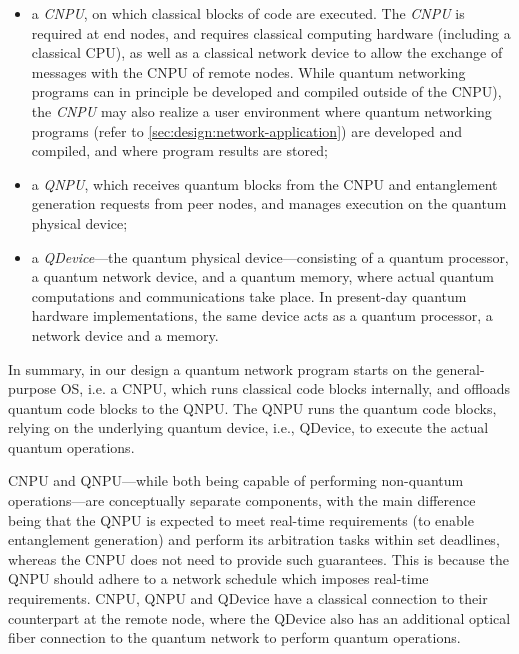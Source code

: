 \begin{itemize}
\item a \emph{\ac{CNPU}}, on which classical blocks of code are executed. The \emph{CNPU} is required at end nodes, and requires classical computing hardware (including a classical \ac{CPU}), as well as a classical network device to allow the exchange of messages with the \ac{CNPU} of remote nodes. While quantum networking programs can in principle be developed and compiled outside of the \ac{CNPU}), the \emph{CNPU} may also realize a user environment where quantum networking programs (refer to \cref{sec:design:network-application}) are developed and compiled, and where program results are stored; 
\item a \emph{\ac{QNPU}}, which receives quantum blocks from the \ac{CNPU} and entanglement generation requests from peer nodes, and manages execution on the quantum physical device; 
\item a \emph{\ac{QDevice}}---the quantum physical device---consisting of a quantum processor, a quantum network device, and a quantum memory, where actual quantum computations and communications take place. In present-day quantum hardware implementations, the same device acts as a quantum processor, a network device and a memory.
\end{itemize}

In summary, in our design a quantum network program starts on the general-purpose \ac{OS}, i.e. a \ac{CNPU}, which runs classical code blocks internally, and offloads quantum code blocks to the \ac{QNPU}. The \ac{QNPU} runs the quantum code blocks, relying on the underlying quantum device, i.e., \ac{QDevice}, to execute the actual quantum operations. 

\ac{CNPU} and \ac{QNPU}---while both being capable of performing non-quantum operations---are conceptually separate components, with the main difference being that the \ac{QNPU} is expected to meet real-time requirements (to enable entanglement generation) and perform its arbitration tasks within set deadlines, whereas the \ac{CNPU} does not need to provide such guarantees. This is because the QNPU should adhere to a network schedule which imposes real-time requirements. \ac{CNPU}, \ac{QNPU} and \ac{QDevice} have a classical connection to their counterpart at the remote node, where the \ac{QDevice} also has an additional optical fiber connection to the quantum network to perform quantum operations.


